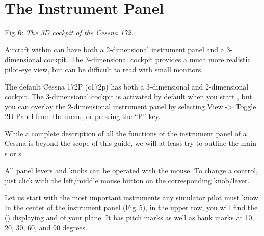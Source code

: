 \section{The Instrument Panel}

 \centerline{}

\smallskip
 \noindent
Fig.\,6: \textit{The 3D cockpit of the Cessna 172.}
\medskip

Aircraft within \FlightGear{} can have both a 2-dimensional instrument panel
and a 3-dimensional cockpit. The 3-dimensional cockpit provides a much
more realistic pilot-eye view, but can be difficult to read with small
monitors.

The default Cessna 172P (c172p) has both a 3-dimensional and 2-dimensional
cockpit. The 3-dimensional cockpit is activated by default when you start
\FlightGear{}, but you can overlay the 2-dimensional instrument panel by
selecting View -> Toggle 2D Panel from the menu, or pressing the ``P'' key.

While a complete description of all the functions of the instrument panel
of a Cessna is beyond the scope of this guide, we will at least try to outline
the main s or s.

All panel levers and knobs can be operated with the mouse. To change a
control, just click with the left/middle mouse button on the
corresponding knob/lever.

Let us start with the most important instruments any simulator pilot must know.
In the
center of the instrument panel (Fig.\,5), in the upper row, you will find the
 () displaying 
and
 of your plane. It has pitch marks as well as bank marks at 10, 20,
30, 60,
and 90 degrees.

